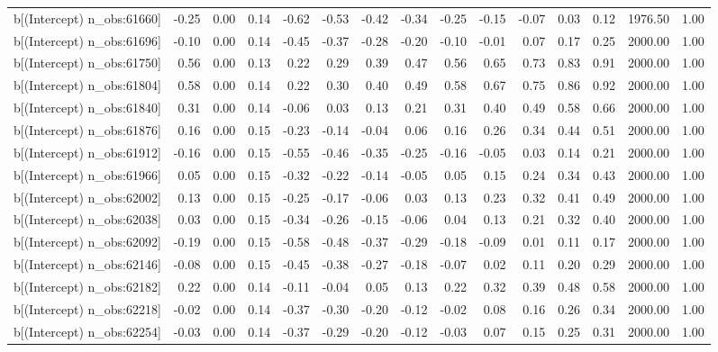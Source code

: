 \begin{table}[ht]
\begin{tabular}{rrrrrrrrrrrrrrr}
  b[(Intercept) n\_obs:61660] & -0.25 & 0.00 & 0.14 & -0.62 & -0.53 & -0.42 & -0.34 & -0.25 & -0.15 & -0.07 & 0.03 & 0.12 & 1976.50 & 1.00 \\ 
  b[(Intercept) n\_obs:61696] & -0.10 & 0.00 & 0.14 & -0.45 & -0.37 & -0.28 & -0.20 & -0.10 & -0.01 & 0.07 & 0.17 & 0.25 & 2000.00 & 1.00 \\ 
  b[(Intercept) n\_obs:61750] & 0.56 & 0.00 & 0.13 & 0.22 & 0.29 & 0.39 & 0.47 & 0.56 & 0.65 & 0.73 & 0.83 & 0.91 & 2000.00 & 1.00 \\ 
  b[(Intercept) n\_obs:61804] & 0.58 & 0.00 & 0.14 & 0.22 & 0.30 & 0.40 & 0.49 & 0.58 & 0.67 & 0.75 & 0.86 & 0.92 & 2000.00 & 1.00 \\ 
  b[(Intercept) n\_obs:61840] & 0.31 & 0.00 & 0.14 & -0.06 & 0.03 & 0.13 & 0.21 & 0.31 & 0.40 & 0.49 & 0.58 & 0.66 & 2000.00 & 1.00 \\ 
  b[(Intercept) n\_obs:61876] & 0.16 & 0.00 & 0.15 & -0.23 & -0.14 & -0.04 & 0.06 & 0.16 & 0.26 & 0.34 & 0.44 & 0.51 & 2000.00 & 1.00 \\ 
  b[(Intercept) n\_obs:61912] & -0.16 & 0.00 & 0.15 & -0.55 & -0.46 & -0.35 & -0.25 & -0.16 & -0.05 & 0.03 & 0.14 & 0.21 & 2000.00 & 1.00 \\ 
  b[(Intercept) n\_obs:61966] & 0.05 & 0.00 & 0.15 & -0.32 & -0.22 & -0.14 & -0.05 & 0.05 & 0.15 & 0.24 & 0.34 & 0.43 & 2000.00 & 1.00 \\ 
  b[(Intercept) n\_obs:62002] & 0.13 & 0.00 & 0.15 & -0.25 & -0.17 & -0.06 & 0.03 & 0.13 & 0.23 & 0.32 & 0.41 & 0.49 & 2000.00 & 1.00 \\ 
  b[(Intercept) n\_obs:62038] & 0.03 & 0.00 & 0.15 & -0.34 & -0.26 & -0.15 & -0.06 & 0.04 & 0.13 & 0.21 & 0.32 & 0.40 & 2000.00 & 1.00 \\ 
  b[(Intercept) n\_obs:62092] & -0.19 & 0.00 & 0.15 & -0.58 & -0.48 & -0.37 & -0.29 & -0.18 & -0.09 & 0.01 & 0.11 & 0.17 & 2000.00 & 1.00 \\ 
  b[(Intercept) n\_obs:62146] & -0.08 & 0.00 & 0.15 & -0.45 & -0.38 & -0.27 & -0.18 & -0.07 & 0.02 & 0.11 & 0.20 & 0.29 & 2000.00 & 1.00 \\ 
  b[(Intercept) n\_obs:62182] & 0.22 & 0.00 & 0.14 & -0.11 & -0.04 & 0.05 & 0.13 & 0.22 & 0.32 & 0.39 & 0.48 & 0.58 & 2000.00 & 1.00 \\ 
  b[(Intercept) n\_obs:62218] & -0.02 & 0.00 & 0.14 & -0.37 & -0.30 & -0.20 & -0.12 & -0.02 & 0.08 & 0.16 & 0.26 & 0.34 & 2000.00 & 1.00 \\ 
  b[(Intercept) n\_obs:62254] & -0.03 & 0.00 & 0.14 & -0.37 & -0.29 & -0.20 & -0.12 & -0.03 & 0.07 & 0.15 & 0.25 & 0.31 & 2000.00 & 1.00 \\ 

\end{tabular}
\end{table}
